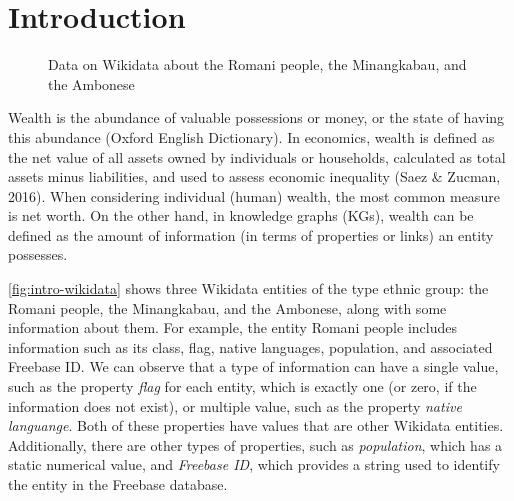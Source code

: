 \section{Introduction}







\begin{figure}[!htbp]
    \centering
    \caption{Data on Wikidata about the Romani people, the Minangkabau, and the Ambonese} \label{fig:intro-wikidata}
\end{figure}

Wealth is the abundance of valuable possessions or money, or the state of having this abundance (Oxford English Dictionary). In economics, wealth is defined as the net value of all assets owned by individuals or households, calculated as total assets minus liabilities, and used to assess economic inequality (Saez \& Zucman, 2016). When considering individual (human) wealth, the most common measure is net worth. On the other hand, in knowledge graphs (KGs), wealth can be defined as the amount of information (in terms of properties or links) an entity possesses.

\autoref{fig:intro-wikidata} shows three Wikidata entities of the type ethnic group: the Romani people, the Minangkabau, and the Ambonese, along with some information about them. For example, the entity Romani people includes information such as its class, flag, native languages, population, and associated Freebase ID. We can observe that a type of information can have a single value, such as the property \textit{flag} for each entity, which is exactly one (or zero, if the information does not exist), or multiple value, such as the property \textit{native languange}. Both of these properties have values that are other Wikidata entities. Additionally, there are other types of properties, such as \textit{population}, which has a static numerical value, and \textit{Freebase ID}, which provides a string used to identify the entity in the Freebase database.

